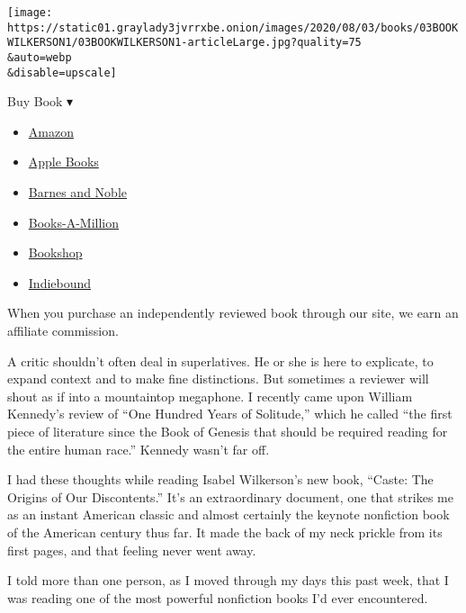 \texttt{[image: https://static01.graylady3jvrrxbe.onion/images/2020/08/03/books/03BOOKWILKERSON1/03BOOKWILKERSON1-articleLarge.jpg?quality=75\\\&auto=webp\\\&disable=upscale]}

Buy Book ▾

\begin{itemize}
\tightlist
\item
  \href{https://www.amazon.com/gp/search?index=books\&tag=NYTBSREV-20\&field-keywords=Caste+Isabel+Wilkerson}{Amazon}
\item
  \href{https://du-gae-books-dot-nyt-du-prd.appspot.com/buy?title=Caste\&author=Isabel+Wilkerson}{Apple
  Books}
\item
  \href{https://www.anrdoezrs.net/click-7990613-11819508?url=https\%3A\%2F\%2Fwww.barnesandnoble.com\%2Fw\%2F\%3Fean\%3D9780593230251}{Barnes
  and Noble}
\item
  \href{https://www.anrdoezrs.net/click-7990613-35140?url=https\%3A\%2F\%2Fwww.booksamillion.com\%2Fp\%2FCaste\%2FIsabel\%2BWilkerson\%2F9780593230251}{Books-A-Million}
\item
  \href{https://bookshop.org/a/3546/9780593230251}{Bookshop}
\item
  \href{https://www.indiebound.org/book/9780593230251?aff=NYT}{Indiebound}
\end{itemize}

When you purchase an independently reviewed book through our site, we
earn an affiliate commission.

A critic shouldn't often deal in superlatives. He or she is here to
explicate, to expand context and to make fine distinctions. But
sometimes a reviewer will shout as if into a mountaintop megaphone. I
recently came upon William Kennedy's review of ``One Hundred Years of
Solitude,'' which he called ``the first piece of literature since the
Book of Genesis that should be required reading for the entire human
race.'' Kennedy wasn't far off.

I had these thoughts while reading Isabel Wilkerson's new book, ``Caste:
The Origins of Our Discontents.'' It's an extraordinary document, one
that strikes me as an instant American classic and almost certainly the
keynote nonfiction book of the American century thus far. It made the
back of my neck prickle from its first pages, and that feeling never
went away.

I told more than one person, as I moved through my days this past week,
that I was reading one of the most powerful nonfiction books I'd ever
encountered.

